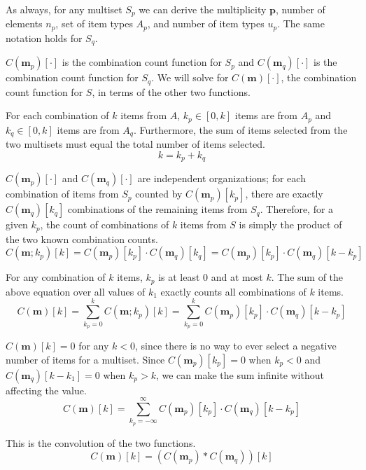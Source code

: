 \documentclass{article}
\begin{document}
As always, for any multiset $S_p$ we can derive the multiplicity $\bm{p}$, number of elements $n_p$, set of item types $A_p$, and number of item types $u_p$. The same notation holds for $S_q$.

$C(\bm{m}_p)[\cdot]$ is the combination count function for $S_p$ and $C(\bm{m}_q)[\cdot]$ is the combination count function for $S_q$. We will solve for $C(\bm{m})[\cdot]$, the combination count function for $S$, in terms of the other two functions.

For each combination of $k$ items from $A$, $k_p \in [0, k]$ items are from $A_p$ and $k_q\in [0, k]$ items are from $A_q$. Furthermore, the sum of items selected from the two multisets must equal the total number of items selected.
\begin{equation}
    k = k_p + k_q
\end{equation}

$C(\bm{m}_p)[\cdot]$ and $C(\bm{m}_q)[\cdot]$ are independent organizations; for each combination of items from $S_p$ counted by $C(\bm{m}_p)[k_p]$, there are exactly $C(\bm{m}_q)[k_q]$ combinations of the remaining items from $S_q$. Therefore, for a given $k_p$, the count of combinations of $k$ items from $S$ is simply the product of the two known combination counts.
\begin{equation}
    C(\bm{m}; k_p)[k] = C(\bm{m}_p)[k_p] \cdot C(\bm{m}_q)[k_q] = C(\bm{m}_p)[k_p] \cdot C(\bm{m}_q)[k - k_p]
\end{equation}

For any combination of $k$ items, $k_p$ is at least $0$ and at most $k$. The sum of the above equation over all values of $k_1$ exactly counts all combinations of $k$ items.
\begin{equation}
    C(\bm{m})[k] = \sum_{k_p = 0}^{k} C(\bm{m}; k_p)[k] = \sum_{k_p = 0}^{k} C(\bm{m}_p)[k_p] \cdot C(\bm{m}_q)[k - k_p]
\end{equation}

$C(\bm{m})[k]=0$ for any $k<0$, since there is no way to ever select a negative number of items for a multiset. Since $C(\bm{m}_p)[k_p] = 0$ when $k_p < 0$ and $C(\bm{m}_q)[k - k_1] = 0$ when $k_p > k$, we can make the sum infinite without affecting the value.
\begin{equation}
    C(\bm{m})[k] = \sum_{k_p = -\infty}^{\infty} C(\bm{m}_p)[k_p] \cdot C(\bm{m}_q)[k - k_p]
\end{equation}

This is the convolution of the two functions.
\begin{equation}
    C(\bm{m})[k] = (C(\bm{m}_p) * C(\bm{m}_q))[k]
\end{equation}
\end{document}
